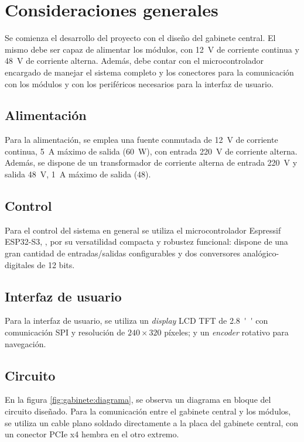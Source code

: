 \section{Consideraciones generales}

Se comienza el desarrollo del proyecto con el diseño del gabinete central. El mismo debe ser capaz de alimentar los módulos, con \SI{12}{\volt} de corriente continua y \SI{48}{\volt} de corriente alterna. Además, debe contar con el microcontrolador encargado de manejar el sistema completo y los conectores para la comunicación con los módulos y con los periféricos necesarios para la interfaz de usuario.

\subsection{Alimentación}

Para la alimentación, se emplea una fuente conmutada de \SI{12}{\volt} de corriente continua, \SI{5}{\ampere} máximo de salida (\SI{60}{\watt}), con entrada \SI{220}{\volt} de corriente alterna. Además, se dispone de un transformador de corriente alterna de entrada \SI{220}{\volt} y salida \SI{48}{\volt}, \SI{1}{\ampere} máximo de salida (\SI{48}{\voltampere}). 

\subsection{Control}

Para el control del sistema en general se utiliza el microcontrolador Espressif ESP32-S3, \parencite{esp32s3}, por su versatilidad compacta y robustez funcional: dispone de una gran cantidad de entradas/salidas configurables y dos conversores analógico-digitales de 12 bits.

\subsection{Interfaz de usuario}

Para la interfaz de usuario, se utiliza un \textit{display} LCD TFT de \SI{2.8}{''} con comunicación SPI y resolución de $240\times320$ píxeles; y un \textit{encoder} rotativo para navegación.

\subsection{Circuito}

En la figura \cref{fig:gabinete:diagrama}, se observa un diagrama en bloque del circuito diseñado. Para la comunicación entre el gabinete central y los módulos, se utiliza un cable plano soldado directamente a la placa del gabinete central, con un conector PCIe x4 hembra en el otro extremo.

